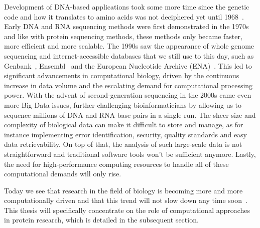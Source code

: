 Development of DNA-based applications took some more time since the genetic code and how it translates to amino acids was not deciphered yet until 1968~\cite{codon}. Early DNA and RNA sequencing methods were first demonstrated in the 1970s~\cite{dnaseq, rna} and like with protein sequencing methods, these methods only became faster, more efficient and more scalable. The 1990s saw the appearance of whole genome sequencing and internet-accessible databases that we still use to this day, such as Genbank~\cite{genbank}, Ensembl~\cite{ensembl} and the European Nucleotide Archive (ENA)~\cite{ena}. This led to significant advancements in computational biology, driven by the continuous increase in data volume and the escalating demand for computational processing power. With the advent of second-generation sequencing in the 2000s came even more Big Data issues, further challenging bioinformaticians by allowing us to sequence millions of DNA and RNA base pairs in a single run. The sheer size and complexity of biological data can make it difficult to store and manage, as for instance implementing error identification, security, quality standards and easy data retrievability. On top of that, the analysis of such large-scale data is not straightforward and traditional software tools won't be sufficient anymore. Lastly, the need for high-performance computing resources to handle all of these computational demands will only rise.

Today we see that research in the field of biology is becoming more and more computationally driven and that this trend will not slow down any time soon~\cite{compbio}. This thesis will specifically concentrate on the role of computational approaches in protein research, which is detailed in the subsequent section.